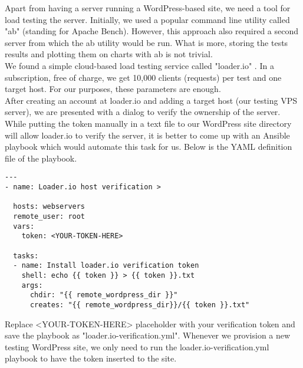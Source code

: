 Apart from having a server running a WordPress-based site, we need a tool for load testing the server. Initially, we used a popular command line utility called "ab" (standing for Apache Bench). However, this approach also required a second server from which the ab utility would be run. What is more, storing the tests results and plotting them on charts with ab is not trivial. \\

We found a simple cloud-based load testing service called "loader.io" \cite{Loader.io:main_site}. In a subscription, free of charge, we get 10,000 clients (requests) per test and one target host. For our purposes, these parameters are enough. \\

After creating an account at loader.io and adding a target host (our testing VPS server), we are presented with a dialog to verify the ownership of the server. While putting the token manually in a text file to our WordPress site directory will allow loader.io to verify the server, it is better to come up with an Ansible playbook which would automate this task for us. Below is the YAML definition file of the playbook.

\begin{lstlisting}
---
- name: Loader.io host verification >
 
  hosts: webservers
  remote_user: root
  vars:
    token: <YOUR-TOKEN-HERE>
 
  tasks:
  - name: Install loader.io verification token
    shell: echo {{ token }} > {{ token }}.txt
    args:
      chdir: "{{ remote_wordpress_dir }}"
      creates: "{{ remote_wordpress_dir}}/{{ token }}.txt"
\end{lstlisting}

Replace <YOUR-TOKEN-HERE> placeholder with your verification token and save the playbook as "loader.io-verification.yml". Whenever we provision a new testing WordPress site, we only need to run the loader.io-verification.yml playbook to have the token inserted to the site.
